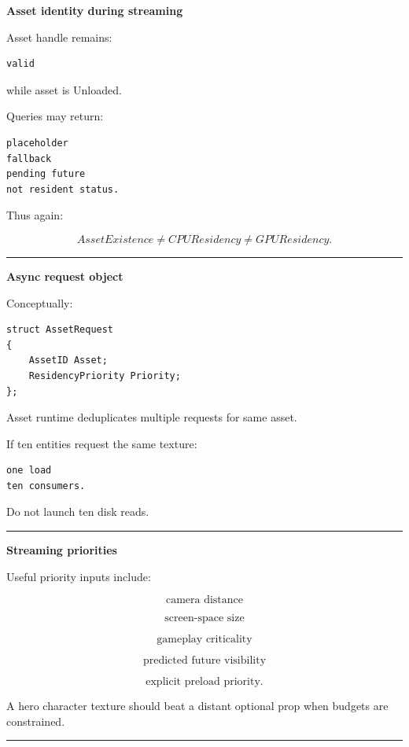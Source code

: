 \textbf{Asset identity during streaming}

Asset handle remains:

\begin{verbatim}
valid
\end{verbatim}

while asset is Unloaded.

Queries may return:

\begin{verbatim}
placeholder
fallback
pending future
not resident status.
\end{verbatim}

Thus again:

\[
AssetExistence
\neq
CPUResidency
\neq
GPUResidency.
\]

\begin{center}\rule{0.5\linewidth}{0.5pt}\end{center}

\textbf{Async request object}

Conceptually:

\begin{verbatim}
struct AssetRequest
{
    AssetID Asset;
    ResidencyPriority Priority;
};
\end{verbatim}

Asset runtime deduplicates multiple requests for same asset.

If ten entities request the same texture:

\begin{verbatim}
one load
ten consumers.
\end{verbatim}

Do not launch ten disk reads.

\begin{center}\rule{0.5\linewidth}{0.5pt}\end{center}

\textbf{Streaming priorities}

Useful priority inputs include:

\[
\text{camera distance}
\]

\[
\text{screen-space size}
\]

\[
\text{gameplay criticality}
\]

\[
\text{predicted future visibility}
\]

\[
\text{explicit preload priority}.
\]

A hero character texture should beat a distant optional prop when budgets are constrained.

\begin{center}\rule{0.5\linewidth}{0.5pt}\end{center}

